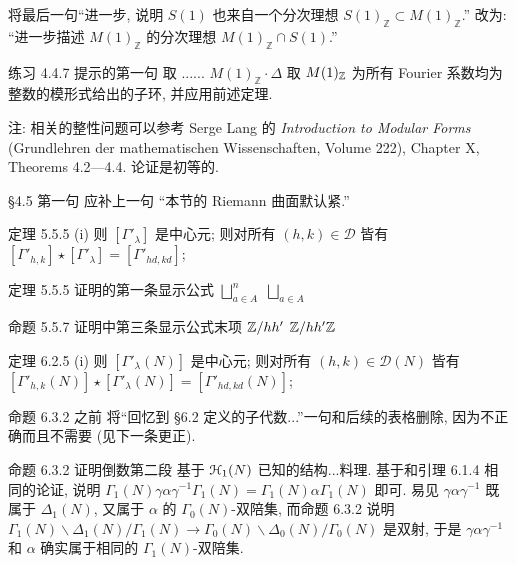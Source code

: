 \documentclass{AJerrata}
\begin{document}
\begin{Errata}
		将最后一句``进一步, 说明 $S(1)$ 也来自一个分次理想 $S(1)_{\mathbb{Z}} \subset M(1)_{\mathbb{Z}}$.'' 改为: ``进一步描述 $M(1)_{\mathbb{Z}}$ 的分次理想 $M(1)_{\mathbb{Z}} \cap S(1)$.''
		
		\item[练习 4.4.7 提示的第一句]
		\Orig 取 ...... $M(1)_{\mathbb{Z}} \cdot \Delta$
		\Corr 取 $M(1)_{\mathbb{Z}}$ 为所有 Fourier 系数均为整数的模形式给出的子环, 并应用前述定理.
		
		注: 相关的整性问题可以参考 Serge Lang 的 \textit{Introduction to Modular Forms} (Grundlehren der mathematischen Wissenschaften, Volume 222), Chapter X, Theorems 4.2---4.4. 论证是初等的.
		
		\item[\S 4.5 第一句]
		应补上一句 ``本节的 Riemann 曲面默认紧.''
		
		\item[定理 5.5.5 (i)]
		\Orig 则 $[\Gamma'_\lambda]$ 是中心元;
		\Corr 则对所有 $(h, k) \in \mathcal{D}$ 皆有 $[\Gamma'_{h,k}] \star [\Gamma'_\lambda] = [\Gamma'_{hd, kd}]$;
		
		\item[定理 5.5.5 证明的第一条显示公式]
		\Orig $\displaystyle\bigsqcup_{a \in A}^n$
		\Corr $\displaystyle\bigsqcup_{a \in A}$
		
		\item[命题 5.5.7 证明中第三条显示公式末项]
		\Orig $\mathbb{Z}/hh'$
		\Corr $\mathbb{Z}/hh' \mathbb{Z}$

		\item[定理 6.2.5 (i)]
		\Orig 则 $[\Gamma'_\lambda(N)]$ 是中心元;
		\Corr 则对所有 $(h, k) \in \mathcal{D}(N)$ 皆有 $[\Gamma'_{h,k}(N)] \star [\Gamma'_\lambda(N)] = [\Gamma'_{hd, kd}(N)]$;

		\item[命题 6.3.2 之前]
		将``回忆到 \S 6.2 定义的子代数...''一句和后续的表格删除, 因为不正确而且不需要 (见下一条更正).
		
		\item[命题 6.3.2 证明倒数第二段]
		\Orig 基于 $\EuScript{H}_1(N)$ 已知的结构...料理.
		\Corr 基于和引理 6.1.4 相同的论证, 说明 $\Gamma_1(N) \gamma\alpha\gamma^{-1} \Gamma_1(N) = \Gamma_1(N)\alpha\Gamma_1(N)$ 即可. 易见 $\gamma\alpha\gamma^{-1}$ 既属于 $\Delta_1(N)$, 又属于 $\alpha$ 的 $\Gamma_0(N)$-双陪集, 而命题 6.3.2 说明 \linebreak $\Gamma_1(N) \backslash \Delta_1(N) / \Gamma_1(N) \to \Gamma_0(N) \backslash \Delta_0(N) / \Gamma_0(N)$ 是双射, 于是 $\gamma\alpha\gamma^{-1}$ 和 $\alpha$ 确实属于相同的 $\Gamma_1(N)$-双陪集.
		

\end{Errata}
\end{document}
